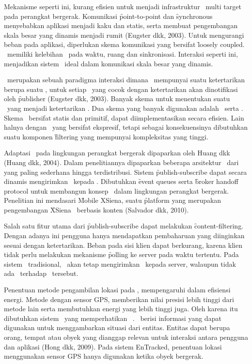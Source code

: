 Mekanisme seperti ini, kurang efisien untuk menjadi infrastruktur
\tracking~multi target pada perangkat bergerak. Komunikasi \f{point-to-point}
dan \f{synchronous} menyebabkan aplikasi menjadi kaku dan statis, serta membuat
pengembangan skala besar yang dinamis menjadi rumit (Eugster dkk, 2003). Untuk
mengurangi beban pada aplikasi, diperlukan skema komunikasi yang bersifat
\f{loosely coupled}. \PubSub~memiliki kelebihan \decoupling~pada waktu, ruang
dan sinkronisasi. Interaksi seperti ini, menjadikan sistem \pubsub~ideal dalam
komunikasi skala besar yang dinamis.

\PubSub~merupakan sebuah paradigma interaksi dimana \subscriber~mempunyai suatu
ketertarikan berupa suatu \event, untuk setiap \event~yang cocok dengan
ketertarikan akan dinotifikasi oleh \f{publisher} (Eugster dkk, 2003). Banyak
skema untuk menentukan suatu \event~yang menjadi ketertarikan \subscriber. Dua
skema yang banyak digunakan adalah \topicbased~serta \contentbased. Skema
\topicbased~bersifat statis dan primitif, dapat diimplementasikan secara
efisien. Lain halnya dengan \contentbased~yang bersifat ekspresif, tetapi
sebagai konsekuensinya dibutuhkan suatu komponen \f{filtering} yang mempunyai
kompleksitas yang tinggi.

Adaptasi \pubsub~pada lingkungan perangkat bergerak dipaparkan oleh Huang dkk
(Huang dkk, 2004). Dalam penelitiannya dipaparkan beberapa arsitektur
\pubsub~dari yang paling sederhana hingga terdistribusi. Sistem
\f{publish-subscribe} dapat secara dinamis mengirimkan \event~kepada
\subscriber. Dibutuhkan \f{event queues} serta \f{broker handoff protocol}
untuk membangun konsep \pubsub~dalam lingkungan perangkat bergerak. Penelitian
ini mendasari \f{Mobile XSiena}, suatu \f{platform} yang merupakan pengembangan
\f{XSiena} \pubsub~berbasis konten (Salvador dkk, 2010).

Salah satu fitur utama dari \f{publish-subscribe} dapat melakukan
\f{content-filtering}. Dengan adanya ini pengguna hanya mendapatkan
pembaharuan yang diinginkan sesuai dengan ketertarikan. Beban pada sisi klien
dapat berkurang, karena klien tidak perlu melakukan mekanisme \f{polling} ke
server pada waktu tertentu. Pada sistem \pubsub~tradisional, \publisher~akan
tetap mengirimkan \event~kepada server, walaupun tidak ada
\subscription~terhadap \event~tersebut.

Penentuan metode pengambilan lokasi pada \tracking, mempengaruhi dalam
efisiensi energi.  Metode dengan sensor GPS, memberikan nilai presisi lebih
tinggi dari metode lain serta membutuhkan energi yang lebih tinggi juga. Oleh
karena itu dibutuhkan sistem \tracking~yang memperhatikan \context~\aware.
\Context~berisi informasi yang dapat digunakan untuk menggambarkan situasi dari
entitas. Entitas dapat berupa orang, tempat atau obyek yang dianggap relevan
untuk interaksi antara pengguna dan aplikasi (Hong dkk, 2009).  Pada sistem
EnTracked, penentuan lokasi menggunakan sensor GPS hanya digunakan ketika obyek
bergerak.

